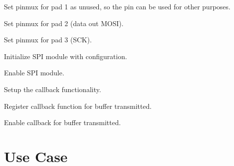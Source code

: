\begin{DoxyEnumerate}
\begin{DoxyEnumerate}
\item Set pinmux for pad 1 as unused, so the pin can be used for other purposes. 
\begin{DoxyCodeInclude}{0}
\end{DoxyCodeInclude}

\item Set pinmux for pad 2 (data out M\+O\+SI). 
\begin{DoxyCodeInclude}{0}
\end{DoxyCodeInclude}

\item Set pinmux for pad 3 (S\+CK). 
\begin{DoxyCodeInclude}{0}
\end{DoxyCodeInclude}

\item Initialize S\+PI module with configuration. 
\begin{DoxyCodeInclude}{0}
\end{DoxyCodeInclude}

\item Enable S\+PI module. 
\begin{DoxyCodeInclude}{0}
\end{DoxyCodeInclude}

\end{DoxyEnumerate}
\item Setup the callback functionality. 
\begin{DoxyCodeInclude}{0}
\end{DoxyCodeInclude}

\begin{DoxyEnumerate}
\item Register callback function for buffer transmitted. 
\begin{DoxyCodeInclude}{0}
\end{DoxyCodeInclude}

\item Enable callback for buffer transmitted. 
\begin{DoxyCodeInclude}{0}
\end{DoxyCodeInclude}
 
\end{DoxyEnumerate}
\end{DoxyEnumerate}\hypertarget{asfdoc_sam0_sercom_spi_master_callback_use_asfdoc_sam0_sercom_spi_master_callback_use_case}{}\section{Use Case}\label{asfdoc_sam0_sercom_spi_master_callback_use_asfdoc_sam0_sercom_spi_master_callback_use_case}

